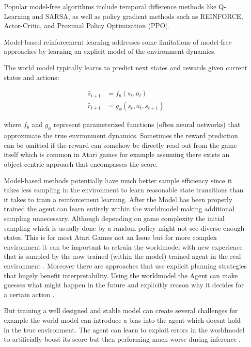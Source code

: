 \documentclass[
	english,
	ruledheaders=section,
	class=report,
	thesis={type=master},
	accentcolor=9c,
	custommargins=true,
	marginpar=false,
	parskip=half-,
	fontsize=11pt,
]{tudapub}
\begin{document}
Popular model-free algorithms include temporal difference methods like
Q-Learning and SARSA, as well as policy gradient methods such as REINFORCE,
Actor-Critic, and Proximal Policy Optimization (PPO).

Model-based reinforcement learning addresses some limitations of model-free
approaches by learning an explicit model of the environment dynamics.

The world model typically learns to predict next states and rewards given
current states and actions:

\begin{align}
	\hat{s}_{t+1} & = f_\theta(s_t, a_t)        \\
	\hat{r}_{t+1} & = g_\phi(s_t, a_t, s_{t+1})
\end{align}

where $f_\theta$ and $g_\phi$ represent parameterized functions (often neural
networks) that approximate the true environment dynamics. Sometimes the reward
prediction can be omitted if the reward can somehow be directly read out from
the game itself which is common in Atari games for example assuming there
exists an object centric approach that encompasses the score.

Model-based methods potentially have much better sample efficiency since it
takes less sampling in the environment to learn reasonable state transitions
than it takes to train a reinforcement learning. After the Model has been
properly trained the agent can learn entirely within the worldmodel making
additional sampling unnecessary. Although depending on game complexity the
initial sampling which is usually done by a random policy might not see diverse
enough states. This is for most Atari Games not an Issue but for more complex
environment it can be important to retrain the worldmodel with new experience
that is sampled by the now trained (within the model) trained agent in the real
environment \cite{janner2019trust,sutton1991dyna}. Moreover there are
approaches that use explicit planning strategies that hugely benefit
interpretability. Using the worldmodel the Agent can make guesses what might
happen in the future and explicitly reason why it decides for a certain action
\cite{schrittwieser2020mastering,greydanus2018visualizing}.

But training a well designed and stable model can create several challenges for
example the world model can introduce a bias into the agent which doesnt hold
in the true environment. The agent can learn to exploit errors in the
worldmodel to artificially boost its score but then performing much worse
during inference \cite{talvitie2017self,lambert2020learning}.
\end{document}
